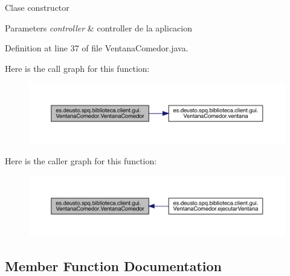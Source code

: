 Clase constructor 
\begin{DoxyParams}{Parameters}
{\em controller} & controller de la aplicacion \\
\hline
\end{DoxyParams}


Definition at line 37 of file Ventana\+Comedor.\+java.

Here is the call graph for this function\+:
\nopagebreak
\begin{figure}[H]
\begin{center}
\leavevmode
\includegraphics[width=350pt]{classes_1_1deusto_1_1spq_1_1biblioteca_1_1client_1_1gui_1_1_ventana_comedor_aca539744e7216aefab50a56a6e6d28c7_cgraph}
\end{center}
\end{figure}
Here is the caller graph for this function\+:
\nopagebreak
\begin{figure}[H]
\begin{center}
\leavevmode
\includegraphics[width=350pt]{classes_1_1deusto_1_1spq_1_1biblioteca_1_1client_1_1gui_1_1_ventana_comedor_aca539744e7216aefab50a56a6e6d28c7_icgraph}
\end{center}
\end{figure}


\subsection{Member Function Documentation}
\mbox{\label{classes_1_1deusto_1_1spq_1_1biblioteca_1_1client_1_1gui_1_1_ventana_comedor_afd75ec87658a9f0ebb4a77e48de601f8}} 
